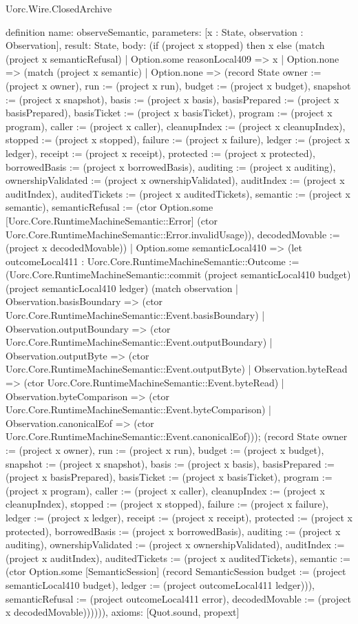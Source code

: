 \begin{lexlean}{Uorc.Wire.ClosedArchive}
\begin{semanticmodule}
definition{
  name: observeSemantic,
  parameters: [x : State, observation : Observation],
  result: State,
  body: (if (project x stopped) then x else (match (project x semanticRefusal)
    | Option.some reasonLocal409 => x
    | Option.none => (match (project x semantic)
      | Option.none => (record State {owner := (project x owner), run := (project x run), budget := (project x budget), snapshot := (project x snapshot), basis := (project x basis), basisPrepared := (project x basisPrepared), basisTicket := (project x basisTicket), program := (project x program), caller := (project x caller), cleanupIndex := (project x cleanupIndex), stopped := (project x stopped), failure := (project x failure), ledger := (project x ledger), receipt := (project x receipt), protected := (project x protected), borrowedBasis := (project x borrowedBasis), auditing := (project x auditing), ownershipValidated := (project x ownershipValidated), auditIndex := (project x auditIndex), auditedTickets := (project x auditedTickets), semantic := (project x semantic), semanticRefusal := (ctor Option.some [Uorc.Core.RuntimeMachineSemantic::Error] (ctor Uorc.Core.RuntimeMachineSemantic::Error.invalidUsage)), decodedMovable := (project x decodedMovable)})
      | Option.some semanticLocal410 => (let outcomeLocal411 : Uorc.Core.RuntimeMachineSemantic::Outcome := (Uorc.Core.RuntimeMachineSemantic::commit (project semanticLocal410 budget) (project semanticLocal410 ledger) (match observation
        | Observation.basisBoundary => (ctor Uorc.Core.RuntimeMachineSemantic::Event.basisBoundary)
        | Observation.outputBoundary => (ctor Uorc.Core.RuntimeMachineSemantic::Event.outputBoundary)
        | Observation.outputByte => (ctor Uorc.Core.RuntimeMachineSemantic::Event.outputByte)
        | Observation.byteRead => (ctor Uorc.Core.RuntimeMachineSemantic::Event.byteRead)
        | Observation.byteComparison => (ctor Uorc.Core.RuntimeMachineSemantic::Event.byteComparison)
        | Observation.canonicalEof => (ctor Uorc.Core.RuntimeMachineSemantic::Event.canonicalEof))); (record State {owner := (project x owner), run := (project x run), budget := (project x budget), snapshot := (project x snapshot), basis := (project x basis), basisPrepared := (project x basisPrepared), basisTicket := (project x basisTicket), program := (project x program), caller := (project x caller), cleanupIndex := (project x cleanupIndex), stopped := (project x stopped), failure := (project x failure), ledger := (project x ledger), receipt := (project x receipt), protected := (project x protected), borrowedBasis := (project x borrowedBasis), auditing := (project x auditing), ownershipValidated := (project x ownershipValidated), auditIndex := (project x auditIndex), auditedTickets := (project x auditedTickets), semantic := (ctor Option.some [SemanticSession] (record SemanticSession {budget := (project semanticLocal410 budget), ledger := (project outcomeLocal411 ledger)})), semanticRefusal := (project outcomeLocal411 error), decodedMovable := (project x decodedMovable)}))))),
  axioms: [Quot.sound, propext]
}


\end{semanticmodule}
\end{lexlean}
